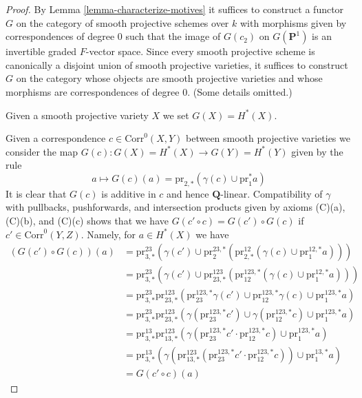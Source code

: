 \begin{proof}
By Lemma \ref{lemma-characterize-motives} it suffices to construct a functor
$G$ on the category of smooth projective schemes over $k$
with morphisms given by correspondences of degree $0$ such that
the image of $G(c_2)$ on $G(\mathbf{P}^1)$ is an invertible graded
$F$-vector space.
Since every smooth projective scheme is canonically a disjoint
union of smooth projective varieties, it suffices to construct
$G$ on the category whose objects are smooth projective varieties
and whose morphisms are correspondences of degree $0$. (Some details
omitted.)

\medskip\noindent
Given a smooth projective variety $X$ we set $G(X) = H^*(X)$.

\medskip\noindent
Given a correspondence $c \in \text{Corr}^0(X, Y)$ between smooth
projective varieties we consider the map
$G(c) : G(X) = H^*(X) \to G(Y) = H^*(Y)$ given by the rule
$$
a \longmapsto
G(c)(a) = \text{pr}_{2, *}(\gamma(c) \cup \text{pr}_1^*a)
$$
It is clear that $G(c)$ is additive in $c$ and hence $\mathbf{Q}$-linear.
Compatibility of $\gamma$ with pullbacks, pushforwards, and
intersection products given by axioms (C)(a), (C)(b), and (C)(c)
shows that we have
$G(c' \circ c) = G(c') \circ G(c)$ if $c' \in \text{Corr}^0(Y, Z)$.
Namely, for $a \in H^*(X)$ we have
\begin{align*}
(G(c') \circ G(c))(a)
& =
\text{pr}^{23}_{3, *}(\gamma(c') \cup
\text{pr}^{23, *}_2(\text{pr}^{12}_{2, *}(\gamma(c) \cup
\text{pr}^{12, *}_1a))) \\
& =
\text{pr}^{23}_{3, *}(\gamma(c') \cup
\text{pr}^{123}_{23, *}(\text{pr}^{123, *}_{12}(\gamma(c) \cup
\text{pr}^{12, *}_1 a))) \\
& =
\text{pr}^{23}_{3, *}
\text{pr}^{123}_{23, *}(
\text{pr}^{123, *}_{23}\gamma(c') \cup
\text{pr}^{123, *}_{12}\gamma(c) \cup
\text{pr}^{123, *}_1 a) \\
& =
\text{pr}^{23}_{3, *}
\text{pr}^{123}_{23, *}(
\gamma(\text{pr}^{123, *}_{23}c') \cup
\gamma(\text{pr}^{123, *}_{12}c) \cup
\text{pr}^{123, *}_1 a) \\
& =
\text{pr}^{13}_{3, *}
\text{pr}^{123}_{13, *}(
\gamma(\text{pr}^{123, *}_{23}c' \cdot \text{pr}^{123, *}_{12}c) \cup
\text{pr}^{123, *}_1 a) \\
& =
\text{pr}^{13}_{3, *}(
\gamma(\text{pr}^{123}_{13, *}(
\text{pr}^{123, *}_{23}c' \cdot \text{pr}^{123, *}_{12}c)) \cup
\text{pr}^{13, *}_1 a) \\
& =
G(c' \circ c)(a)
\end{align*}

\end{proof}
